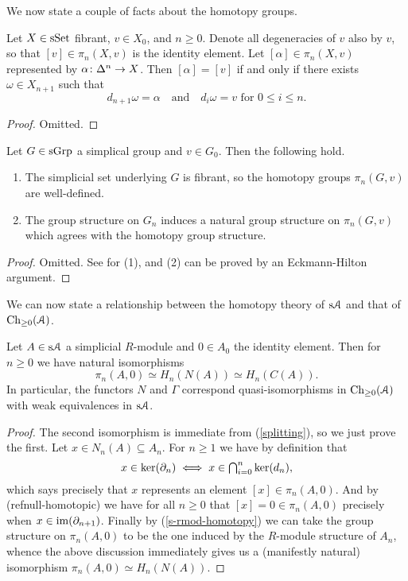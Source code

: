 We now state a couple of facts about the homotopy groups.

\begin{lemma}
  \label{null-homotopic}
  Let $X \in \mathrm{s}\mathrm{Set}$ fibrant, $v \in X_0$, and $n \ge 0$. Denote all
  degeneracies of $v$ also by $v$, so that $[v] \in \pi_n(X,v)$ is the
  identity element. Let $[\alpha] \in \pi_n(X,v)$ represented by
  $\alpha \colon \Delta^n \to X$. Then $[\alpha] = [v]$ if and only if
  there exists $\omega \in X_{n+1}$ such that
  \[
  d_{n+1}\omega = \alpha \quad\text{and}\quad d_i\omega = v\text{ for
  } 0 \le i \le n.
  \]
\end{lemma}

\begin{proof}
  Omitted.
\end{proof}

\begin{lemma}
  \label{s-rmod-homotopy}
  Let $G \in \mathrm{s}\mathrm{Grp}$ a simplical group and $v \in G_0$. Then the
  following hold.
  \begin{enumerate}
  \item The simplicial set underlying $G$ is fibrant, so the homotopy
    groups $\pi_n(G,v)$ are well-defined.
  \item The group structure on $G_n$ induces a natural group structure
    on $\pi_n(G,v)$ which agrees with the homotopy group structure.
  \end{enumerate}
\end{lemma}

\begin{proof}
  Omitted. See \cite{goerssjardine} for (1), and (2) can be proved by
  an Eckmann-Hilton argument.
\end{proof}

We can now state a relationship between the homotopy theory of $\mathrm{s}\mathcal{A}$
and that of $\mathrm{Ch}_{\ge 0}(\mathcal{A})$.

\begin{proposition}
  \label{homotopy-homology}
  Let $A \in \mathrm{s}\mathcal{A}$ a simplicial $R$-module and $0 \in A_0$ the
  identity element. Then for $n \ge 0$ we have natural isomorphisms
  \[
  \pi_n(A,0) \simeq H_n(N(A)) \simeq H_n(C(A)).
  \]
  In particular, the functors $N$ and $\Gamma$ correspond
  quasi-isomorphisms in $\mathrm{Ch}_{\ge 0}(\mathcal{A})$ with weak equivalences in
  $\mathrm{s}\mathcal{A}$.
\end{proposition}

\begin{proof}
  The second isomorphism is immediate from (\ref{splitting}), so we
  just prove the first. Let $x \in N_n(A) \subseteq A_n$. For $n \ge
  1$ we have by definition that
  \[
  \textstyle{x \in \operatorname{ker}(\partial_n) \iff x \in \bigcap_{i=0}^n \operatorname{ker}(d_n)},
  \]
  which says precisely that $x$ represents an element $[x] \in
  \pi_n(A,0)$. And by (ref{null-homotopic}) we have for all $n \ge 0$
  that $[x] = 0 \in \pi_n(A,0)$ precisely when $x \in
  \operatorname{im}(\partial_{n+1})$. Finally by (\ref{s-rmod-homotopy}) we can take the
  group structure on $\pi_n(A,0)$ to be the one induced by the
  $R$-module structure of $A_n$, whence the above discussion
  immediately gives us a (manifestly natural) isomorphism $\pi_n(A,0)
  \simeq H_n(N(A))$.
\end{proof}

